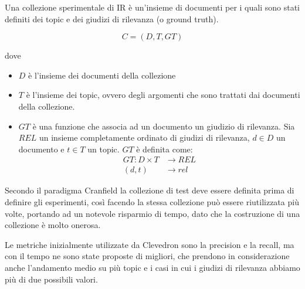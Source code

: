 Una collezione sperimentale di IR è un'insieme di documenti per i quali sono stati definiti dei topic e dei giudizi di rilevanza (o ground truth).

$$
C = (D, T, GT)
$$

dove 

\begin{itemize}
	\item $D$ è l'insieme dei documenti della collezione
	\item $T$ è l'insieme dei topic, ovvero degli argomenti che sono trattati dai documenti della collezione.
	\item $GT$ è una funzione che associa ad un documento un giudizio di rilevanza. Sia $REL$ un insieme completamente ordinato di giudizi di rilevanza, $d \in D$ un documento e $t \in T$ un topic. $GT$ è definita come:
	\begin{align*}
		GT:  D\times T &\to REL \\
		    (d, t) &\to rel
	\end{align*}
\end{itemize}

Secondo il paradigma Cranfield la collezione di test deve essere definita prima di definire gli esperimenti, così facendo la stessa collezione può essere riutilizzata più volte, portando ad un notevole risparmio di tempo, dato che la costruzione di una collezione è molto onerosa.

Le metriche inizialmente utilizzate da Clevedron sono la precision e la recall, ma con il tempo ne sono state proposte di migliori, che prendono in considerazione anche l'andamento medio su più topic e i casi in cui i giudizi di rilevanza abbiamo più di due possibili valori.

